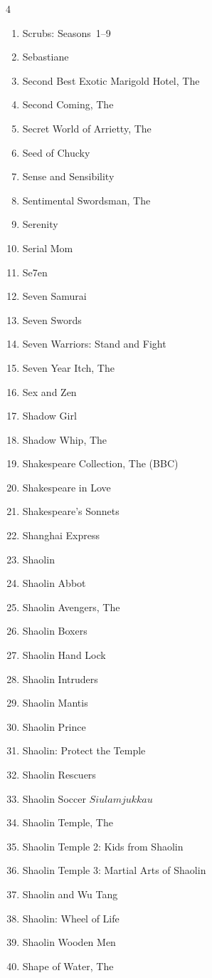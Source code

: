 \documentclass{article}
\begin{document}
\begin{multicols}{4}
\begin{enumerate}
\item Scrubs: Seasons~1--9
\item Sebastiane
\item Second Best Exotic Marigold Hotel, The
\item Second Coming, The
\item Secret World of Arrietty, The
\item Seed of Chucky
\item Sense and Sensibility
\item Sentimental Swordsman, The
\item Serenity
\item Serial Mom
\item Se7en
\item Seven Samurai
\item Seven Swords
\item Seven Warriors: Stand and Fight
\item Seven Year Itch, The
\item Sex and Zen
\item Shadow Girl
\item Shadow Whip, The
\item Shakespeare Collection, The (BBC)
\item Shakespeare in Love
\item Shakespeare's Sonnets
\item Shanghai Express
\item Shaolin
\item Shaolin Abbot
\item Shaolin Avengers, The
\item Shaolin Boxers
\item Shaolin Hand Lock
\item Shaolin Intruders
\item Shaolin Mantis
\item Shaolin Prince
\item Shaolin: Protect the Temple
\item Shaolin Rescuers
\item Shaolin Soccer \(Siu lam juk kau\)
\item Shaolin Temple, The
\item Shaolin Temple 2: Kids from Shaolin
\item Shaolin Temple 3: Martial Arts of Shaolin
\item Shaolin and Wu Tang
\item Shaolin: Wheel of Life
\item Shaolin Wooden Men
\item Shape of Water, The

\end{enumerate}
\end{multicols}
\end{document}
